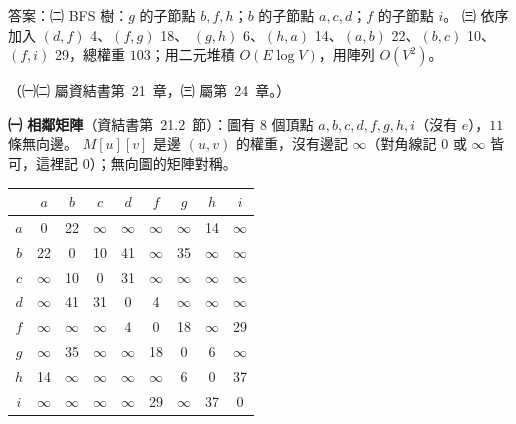 \begin{pastsoln}
答案：㈡ BFS 樹：$g$ 的子節點 $b, f, h$；$b$ 的子節點 $a, c, d$；$f$ 的子節點 $i$。 ㈢ 依序加入 $(d,f)$ 4、$(f,g)$ 18、
$(g,h)$ 6、$(h,a)$ 14、$(a,b)$ 22、$(b,c)$ 10、$(f,i)$ 29，總權重 $103$；用二元堆積 $O(E \log V)$，用陣列 $O(V^{2})$。

（㈠㈡ 屬資結書第~21~章，㈢ 屬第~24~章。）

\textbf{㈠ 相鄰矩陣}（資結書第~21.2~節）：圖有 $8$ 個頂點 $a, b, c, d, f, g, h, i$（沒有 $e$），$11$ 條無向邊。 $M[u][v]$
是邊 $(u,v)$ 的權重，沒有邊記 $\infty$（對角線記 $0$ 或 $\infty$ 皆可，這裡記 $0$）；無向圖的矩陣對稱。
\begin{center}
\small
\begin{tabular}{c|cccccccc}
 & $a$ & $b$ & $c$ & $d$ & $f$ & $g$ & $h$ & $i$ \\ \hline
$a$ & 0 & 22 & $\infty$ & $\infty$ & $\infty$ & $\infty$ & 14 & $\infty$ \\
$b$ & 22 & 0 & 10 & 41 & $\infty$ & 35 & $\infty$ & $\infty$ \\
$c$ & $\infty$ & 10 & 0 & 31 & $\infty$ & $\infty$ & $\infty$ & $\infty$ \\
$d$ & $\infty$ & 41 & 31 & 0 & 4 & $\infty$ & $\infty$ & $\infty$ \\
$f$ & $\infty$ & $\infty$ & $\infty$ & 4 & 0 & 18 & $\infty$ & 29 \\
$g$ & $\infty$ & 35 & $\infty$ & $\infty$ & 18 & 0 & 6 & $\infty$ \\
$h$ & 14 & $\infty$ & $\infty$ & $\infty$ & $\infty$ & 6 & 0 & 37 \\
$i$ & $\infty$ & $\infty$ & $\infty$ & $\infty$ & 29 & $\infty$ & 37 & 0 \\
\end{tabular}
\end{center}


\end{pastsoln}
